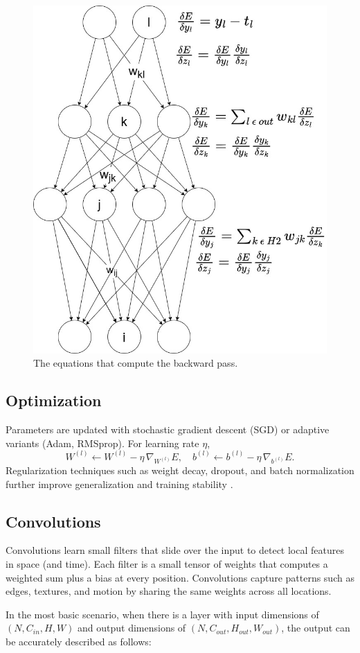\begin{figure}[ht]
    \centering
    \includegraphics[width=0.6\linewidth]{figures/neural_net_back_prop.jpg}
    \caption{The equations that compute the backward pass.} 
    \label{fig:backward_pass}
\end{figure}

\subsection{Optimization}
Parameters are updated with stochastic gradient descent (SGD) or adaptive variants (Adam, RMSprop). For learning rate \(\eta\),
\[
W^{(l)} \leftarrow W^{(l)} - \eta\,\nabla_{W^{(l)}}E,
\quad
b^{(l)} \leftarrow b^{(l)} - \eta\,\nabla_{b^{(l)}}E.
\]
Regularization techniques such as weight decay, dropout, and batch normalization further improve generalization and training stability \cite{ioffe_batch_2015}.

\subsection{Convolutions}

Convolutions learn small filters that slide over the input to detect local features in space (and time). Each filter is a small tensor of weights that computes a weighted sum plus a bias at every position. Convolutions capture patterns such as edges, textures, and motion by sharing the same weights across all locations.  

In the most basic scenario, when there is a layer with input dimensions of \( (N, C_{in}, H, W)\) and output dimensions of \( (N, C_{out}, H_{out}, W_{out})\), the output can be accurately described as follows:

